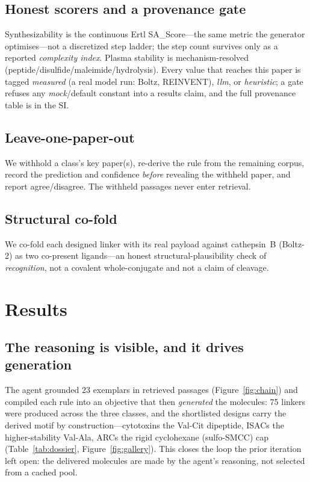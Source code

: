 \documentclass[10pt]{article}
\begin{document}
\subsection{Honest scorers and a provenance gate}
Synthesizability is the continuous Ertl SA\_Score---the same metric the generator optimises---not a discretized step ladder; the step count survives only as a reported \emph{complexity index}. Plasma stability is mechanism-resolved (peptide/disulfide/maleimide/hydrolysis). Every value that reaches this paper is tagged \emph{measured} (a real model run: Boltz, REINVENT), \emph{llm}, or \emph{heuristic}; a gate refuses any \emph{mock}/default constant into a results claim, and the full provenance table is in the SI.

\subsection{Leave-one-paper-out}
We withhold a class's key paper(s), re-derive the rule from the remaining corpus, record the prediction and confidence \emph{before} revealing the withheld paper, and report agree/disagree. The withheld passages never enter retrieval.

\subsection{Structural co-fold}
We co-fold each designed linker with its real payload against cathepsin~B (Boltz-2) as two co-present ligands---an honest structural-plausibility check of \emph{recognition}, not a covalent whole-conjugate and not a claim of cleavage.
\section{Results}\subsection{The reasoning is visible, and it drives generation}
The agent grounded 23 exemplars in retrieved passages (Figure~\ref{fig:chain}) and compiled each rule into an objective that then \emph{generated} the molecules: 75 linkers were produced across the three classes, and the shortlisted designs carry the derived motif by construction---cytotoxins the Val-Cit dipeptide, ISACs the higher-stability Val-Ala, ARCs the rigid cyclohexane (sulfo-SMCC) cap (Table~\ref{tab:dossier}, Figure~\ref{fig:gallery}). This closes the loop the prior iteration left open: the delivered molecules are made by the agent's reasoning, not selected from a cached pool.
\end{document}
